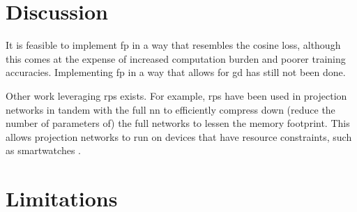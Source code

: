 \section{Discussion}

It is feasible to implement \gls{fp} in a way that resembles the cosine loss, although this comes at the expense of increased computation burden and poorer training accuracies. Implementing \gls{fp} in a way that allows for \gls{gd} has still not been done.
\bigskip

Other work leveraging \gls{rp}s exists. For example, \gls{rp}s have been used in projection networks in tandem with the full \gls{nn} to efficiently compress down (reduce the number of parameters of) the full networks to lessen the memory footprint. This allows projection networks to run on devices that have resource constraints, such as smartwatches \cite{projection_net}. 
\bigskip

\section{Limitations}